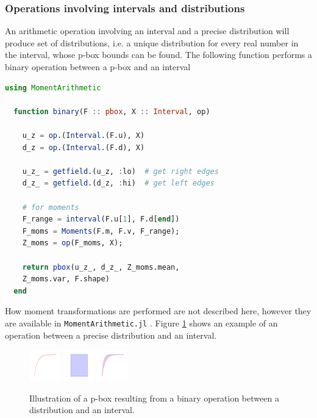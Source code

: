 \documentclass{juliacon}
\begin{document}
\subsubsection{Operations involving intervals and distributions}
An arithmetic operation involving an interval and a precise distribution will produce set of distributions, i.e. a unique distribution for every real number in the interval, whose p-box bounds can be found. The following function performs a binary operation between a p-box and an interval
\begin{lstlisting}[language = Julia]
  using MomentArithmetic

  function binary(F :: pbox, X :: Interval, op)

    u_z = op.(Interval.(F.u), X)
    d_z = op.(Interval.(F.d), X)

    u_z_ = getfield.(u_z, :lo)  # get right edges
    d_z_ = getfield.(d_z, :hi)  # get left edges

    # for moments
    F_range = interval(F.u[1], F.d[end])
    F_moms = Moments(F.m, F.v, F_range);
    Z_moms = op(F_moms, X);

    return pbox(u_z_, d_z_, Z_moms.mean, 
    Z_moms.var, F.shape)
  end
\end{lstlisting}
\noindent How moment transformations are performed are not described here, however they are available in \texttt{MomentArithmetic.jl} \cite{ferson2021distribution}. Figure \ref{fig:figure4} shows an example of an operation between a precise distribution and an interval.
\begin{figure}[htp]
  \centering
  \includegraphics[width=0.12\textwidth]{../examples/JuliaCon/fig4/fig4_dist.pdf}
  \raisebox{8.0mm}{\noindent\Large*}
  \includegraphics[width=0.12\textwidth]{../examples/JuliaCon/fig4/fig4_in.pdf}
  \raisebox{9.0mm}{{\Large$\rightarrow$}}
  \includegraphics[width=0.12\textwidth]{../examples/JuliaCon/fig4/fig4_pbox.pdf}
  \caption{Illustration of a p-box resulting from a binary operation between a distribution and an interval.}
  \label{fig:figure4}
\end{figure}
\end{document}
